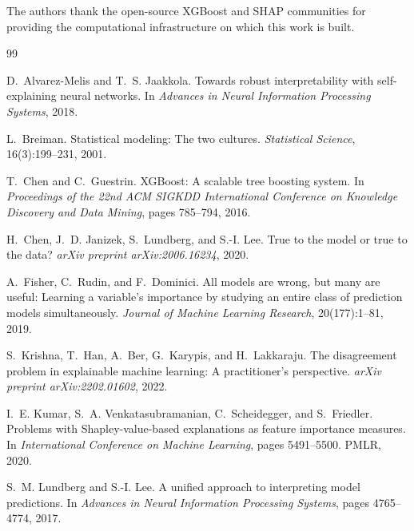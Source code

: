 \documentclass[11pt]{article}
\begin{document}
The authors thank the open-source XGBoost and SHAP communities for
providing the computational infrastructure on which this work is built.



% 

\begin{thebibliography}{99}

D.~Alvarez-Melis and T.~S. Jaakkola.
\newblock Towards robust interpretability with self-explaining neural networks.
\newblock In \emph{Advances in Neural Information Processing Systems}, 2018.

L.~Breiman.
\newblock Statistical modeling: The two cultures.
\newblock \emph{Statistical Science}, 16(3):199--231, 2001.

T.~Chen and C.~Guestrin.
\newblock XGBoost: A scalable tree boosting system.
\newblock In \emph{Proceedings of the 22nd ACM SIGKDD International Conference
  on Knowledge Discovery and Data Mining}, pages 785--794, 2016.

H.~Chen, J.~D. Janizek, S.~Lundberg, and S.-I. Lee.
\newblock True to the model or true to the data?
\newblock \emph{arXiv preprint arXiv:2006.16234}, 2020.

A.~Fisher, C.~Rudin, and F.~Dominici.
\newblock All models are wrong, but many are useful: Learning a variable's
  importance by studying an entire class of prediction models simultaneously.
\newblock \emph{Journal of Machine Learning Research}, 20(177):1--81, 2019.

S.~Krishna, T.~Han, A.~Ber, G.~Karypis, and H.~Lakkaraju.
\newblock The disagreement problem in explainable machine learning: A
  practitioner's perspective.
\newblock \emph{arXiv preprint arXiv:2202.01602}, 2022.

I.~E. Kumar, S.~A. Venkatasubramanian, C.~Scheidegger, and S.~Friedler.
\newblock Problems with {S}hapley-value-based explanations as feature importance
  measures.
\newblock In \emph{International Conference on Machine Learning}, pages
  5491--5500. PMLR, 2020.

S.~M. Lundberg and S.-I. Lee.
\newblock A unified approach to interpreting model predictions.
\newblock In \emph{Advances in Neural Information Processing Systems}, pages
  4765--4774, 2017.


\end{thebibliography}
\end{document}
